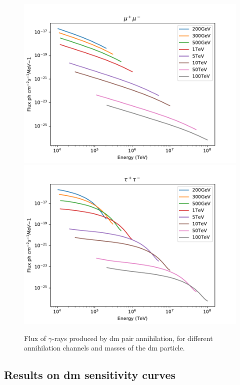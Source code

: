 \documentclass[main.tex]{subfiles}
\begin{document}
\begin{figure}[h!]
  \endminipage \\
  \includegraphics[width=1\textwidth]{Pictures/specMu.pdf}
  \endminipage
  \includegraphics[width=1\textwidth]{Pictures/specTau.pdf}
  \endminipage \\
  \caption{Flux of $\gamma$-rays produced by \gls{dm} pair annihilation, for different annihilation channels and masses of the \gls{dm} particle. }
  \label{fig:dmspec}
\end{figure}

\subsection{Results on \gls{dm} sensitivity curves}
\end{document}

